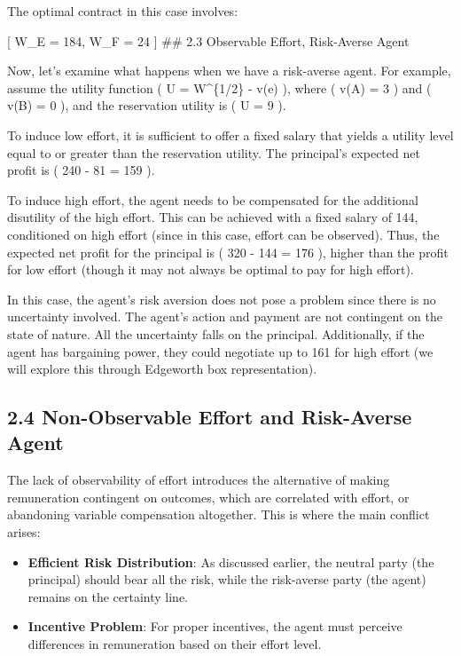 \documentclass[
  letterpaper,
  DIV=11,
  numbers=noendperiod]{scrartcl}
\begin{document}
The optimal contract in this case involves:

{[} W\_E = 184, \quad W\_F = 24 {]} \#\# 2.3 Observable Effort,
Risk-Averse Agent

Now, let's examine what happens when we have a risk-averse agent. For
example, assume the utility function ( U = W\^{}\{1/2\} - v(e) ), where
( v(A) = 3 ) and ( v(B) = 0 ), and the reservation utility is ( U = 9 ).

To induce low effort, it is sufficient to offer a fixed salary that
yields a utility level equal to or greater than the reservation utility.
The principal's expected net profit is ( 240 - 81 = 159 ).

To induce high effort, the agent needs to be compensated for the
additional disutility of the high effort. This can be achieved with a
fixed salary of 144, conditioned on high effort (since in this case,
effort can be observed). Thus, the expected net profit for the principal
is ( 320 - 144 = 176 ), higher than the profit for low effort (though it
may not always be optimal to pay for high effort).

In this case, the agent's risk aversion does not pose a problem since
there is no uncertainty involved. The agent's action and payment are not
contingent on the state of nature. All the uncertainty falls on the
principal. Additionally, if the agent has bargaining power, they could
negotiate up to 161 for high effort (we will explore this through
Edgeworth box representation).

\subsection{2.4 Non-Observable Effort and Risk-Averse
Agent}\label{non-observable-effort-and-risk-averse-agent}

The lack of observability of effort introduces the alternative of making
remuneration contingent on outcomes, which are correlated with effort,
or abandoning variable compensation altogether. This is where the main
conflict arises:

\begin{itemize}
\item
  \textbf{Efficient Risk Distribution}: As discussed earlier, the
  neutral party (the principal) should bear all the risk, while the
  risk-averse party (the agent) remains on the certainty line.
\item
  \textbf{Incentive Problem}: For proper incentives, the agent must
  perceive differences in remuneration based on their effort level.
\end{itemize}
\end{document}
